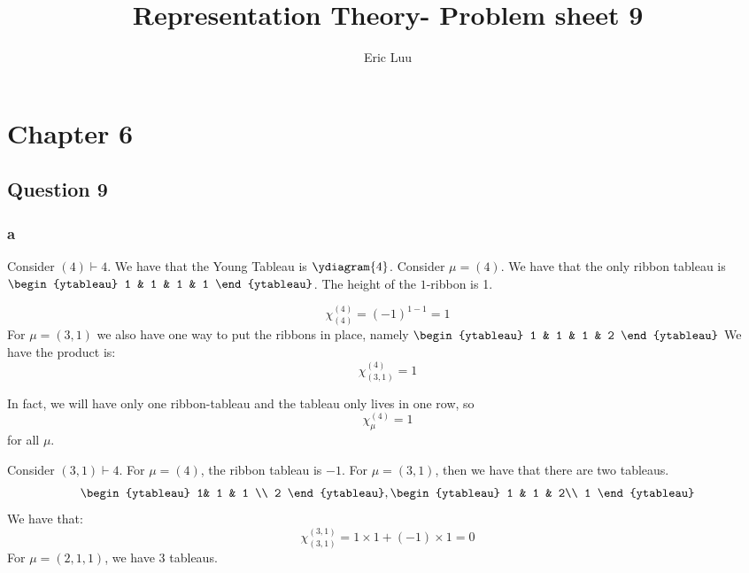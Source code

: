 \documentclass[]{article}
\title{Representation Theory- Problem sheet 9}
\author{Eric Luu}
\begin{document}
\maketitle

\section*{Chapter 6}
\subsection*{Question 9}

\subsubsection*{a}
Consider $(4) \vdash 4$. We have that the Young Tableau is $\ydiagram{4}$. 
Consider $\mu = (4)$. We have that the only ribbon tableau is $\begin{ytableau}
	1 & 1 & 1 & 1
\end{ytableau}
$. The height of the $1$-ribbon is 1. 

\begin{equation}
	\chi^{(4)}_{(4)} = (-1)^{1 - 1} = 1
\end{equation}
For $\mu = (3, 1)$
we also have one way to put the ribbons in place, namely
$\begin{ytableau}
	1 & 1 & 1 & 2
\end{ytableau}
$
 We have the product is:
\begin{equation}
	\chi^{(4)}_{(3,1)} = 1
\end{equation}

In fact, we will have only one ribbon-tableau and the tableau only lives in one row, so
\begin{equation}
	\chi^{(4)}_{\mu} = 1
\end{equation}
for all $\mu$.

Consider $(3,1) \vdash 4$. For $\mu = (4)$, the ribbon tableau is $-1$. 
For $\mu = (3,1)$, then we have that there are two tableaus.
\begin{equation}
	\begin{ytableau}
		1& 1 & 1 \\
		2
	\end{ytableau}
	,
	\begin{ytableau}
		1 & 1 & 2\\
		1
	\end{ytableau}
\end{equation}
We have that:
\begin{equation}
	\chi^{(3,1)}_{(3,1)} = 1 \times 1 + (-1) \times 1 = 0
\end{equation}
For $\mu = (2,1,1)$, we have 3 tableaus. 
\end{document}
